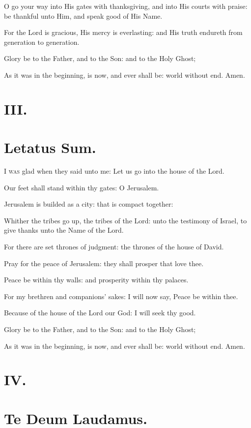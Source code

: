 O go your way into His gates with thanksgiving, and into His courts with praise: be thankful unto Him, and speak good of His Name.

For the Lord is gracious, His mercy is everlasting: and His truth endureth from generation to generation.

Glory be to the Father, and to the Son: and to the Holy Ghost;

As it was in the beginning, is now, and ever shall be: world without end. Amen.

\section*{III.}
\section*{Letatus Sum.}

\lettrine{I}{ was} glad when they said unto me: Let us go into the house of the Lord.

Our feet shall stand within thy gates: O Jerusalem.

Jerusalem is builded as a city: that is compact together:

Whither the tribes go up, the tribes of the Lord: unto the testimony of Israel, to give thanks unto the Name of the Lord.

For there are set thrones of judgment: the thrones of the house of David.

Pray for the peace of Jerusalem: they shall prosper that love thee.

Peace be within thy walls: and prosperity within thy palaces.

For my brethren and companions' sakes: I will now say, Peace be within thee.

Because of the house of the Lord our God: I will seek thy good.

Glory be to the Father, and to the Son: and to the Holy Ghost;

As it was in the beginning, is now, and ever shall be: world without end. Amen. 

\section*{IV.}
\section*{Te Deum Laudamus.}

